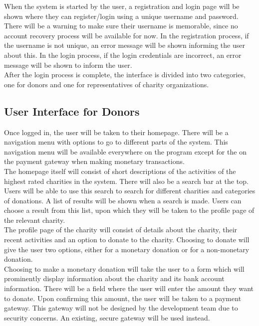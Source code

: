 \documentclass{scrreprt}
\begin{document}
When the system is started by the user, a registration and login page will be shown where they can register/login using a unique username and password. There will be a warning to make sure their username is memorable, since no account recovery process will be available for now. In the registration process, if the username is not unique, an error message will be shown informing the user about this. In the login process, if the login credentials are incorrect, an error message will be shown to inform the user.\\

After the login process is complete, the interface is divided into two categories, one for donors and one for representatives of charity organizations.\\

\subsection*{User Interface for Donors}

Once logged in, the user will be taken to their homepage. There will be a navigation menu with options to go to different parts of the system. This navigation menu will be available everywhere on the program except for the on the payment gateway when making monetary transactions.\\

The homepage itself will consist of short descriptions of the activities of the highest rated charities in the system. There will also be a search bar at the top. Users will be able to use this search to search for different charities and categories of donations. A list of results will be shown when a search is made. Users can choose a result from this list, upon which they will be taken to the profile page of the relevant charity.\\

The profile page of the charity will consist of details about the charity, their recent activities and an option to donate to the charity. Choosing to donate will give the user two options, either for a monetary donation or for a non-monetary donation.\\

Choosing to make a monetary donation will take the user to a form which will prominently display information about the charity and its bank account information. There will be a field where the user will enter the amount they want to donate. Upon confirming this amount, the user will be taken to a payment gateway. This gateway will not be designed by the development team due to security concerns. An existing, secure gateway will be used instead.\\
\end{document}
